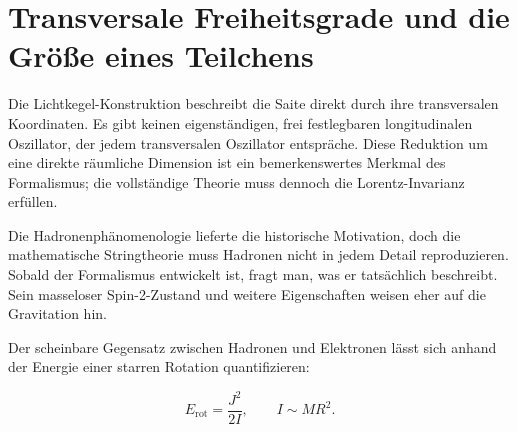 \section{Transversale Freiheitsgrade und die Größe eines Teilchens}

Die Lichtkegel-Konstruktion beschreibt die Saite direkt durch ihre transversalen Koordinaten. Es gibt keinen eigenständigen, frei festlegbaren longitudinalen Oszillator, der jedem transversalen Oszillator entspräche. Diese Reduktion um eine direkte räumliche Dimension ist ein bemerkenswertes Merkmal des Formalismus; die vollständige Theorie muss dennoch die Lorentz-Invarianz erfüllen.

\begin{classroomqa}
\end{classroomqa}

\begin{classroomqa}
\end{classroomqa}

Die Hadronenphänomenologie lieferte die historische Motivation, doch die mathematische Stringtheorie muss Hadronen nicht in jedem Detail reproduzieren. Sobald der Formalismus entwickelt ist, fragt man, was er tatsächlich beschreibt. Sein masseloser Spin-2-Zustand und weitere Eigenschaften weisen eher auf die Gravitation hin.

Der scheinbare Gegensatz zwischen Hadronen und Elektronen lässt sich anhand der Energie einer starren Rotation quantifizieren:

\begin{equation}
  E_{\mathrm{rot}}=\frac{J^2}{2I},
  \qquad
  I\sim MR^2.
  \label{eq:l01-rotational-energy}
\end{equation}

